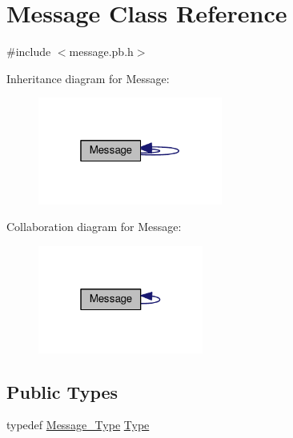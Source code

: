 \hypertarget{class_message}{}\section{Message Class Reference}
\label{class_message}


{\ttfamily \#include $<$message.\+pb.\+h$>$}



Inheritance diagram for Message\+:\nopagebreak
\begin{figure}[H]
\begin{center}
\leavevmode
\includegraphics[width=172pt]{class_message__inherit__graph}
\end{center}
\end{figure}


Collaboration diagram for Message\+:\nopagebreak
\begin{figure}[H]
\begin{center}
\leavevmode
\includegraphics[width=154pt]{class_message__coll__graph}
\end{center}
\end{figure}
\subsection*{Public Types}
\begin{DoxyCompactItemize}
\item 
typedef \hyperlink{message_8pb_8h_a1b620cd54f3d6b48f3c5f7979545b160}{Message\+\_\+\+Type} \hyperlink{class_message_a587bf4d6e90da72f7ba67689081e6bcb}{Type}
\end{DoxyCompactItemize}
